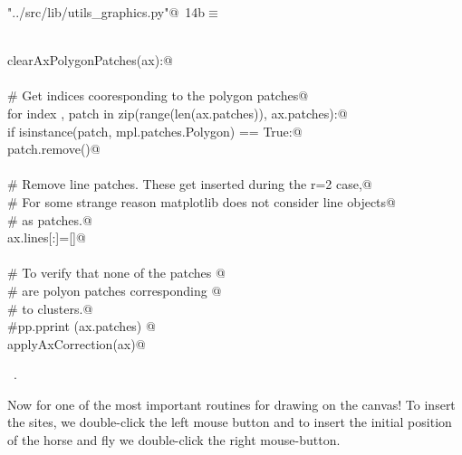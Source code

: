 \documentclass[11.5pt]{report}
\begin{document}
\begin{flushleft} \small\label{scrap4}\raggedright\small
{} \verb@"../src/lib/utils_graphics.py"@\nobreak\ {\footnotesize {14b}}$\equiv$
\vspace{-1ex}
\begin{list}{}{} \item
\mbox{}\verb@@\\
\mbox{}\verb@def clearAxPolygonPatches(ax):@\\
\mbox{}\verb@@\\
\mbox{}\verb@    # Get indices cooresponding to the polygon patches@\\
\mbox{}\verb@    for index , patch in zip(range(len(ax.patches)), ax.patches):@\\
\mbox{}\verb@        if isinstance(patch, mpl.patches.Polygon) == True:@\\
\mbox{}\verb@            patch.remove()@\\
\mbox{}\verb@@\\
\mbox{}\verb@    # Remove line patches. These get inserted during the r=2 case,@\\
\mbox{}\verb@    # For some strange reason matplotlib does not consider line objects@\\
\mbox{}\verb@    # as patches.@\\
\mbox{}\verb@    ax.lines[:]=[]@\\
\mbox{}\verb@@\\
\mbox{}\verb@    # To verify that none of the patches @\\
\mbox{}\verb@    # are polyon patches corresponding @\\
\mbox{}\verb@    # to clusters.@\\
\mbox{}\verb@    #pp.pprint (ax.patches) @\\
\mbox{}\verb@    applyAxCorrection(ax)@\\
\mbox{}\verb@@{\NWsep}
\end{list}
\vspace{-1.5ex}
\footnotesize
\begin{list}{}{\setlength{\itemsep}{-\parsep}\setlength{\itemindent}{-\leftmargin}}
\item \NWtxtFileDefBy\ .

\item{}
\end{list}
\vspace{4ex}
\end{flushleft}
\newchunk Now for one of the most important routines for drawing on the canvas! 
To insert the sites, we double-click the left mouse button and to insert the 
initial position of the horse and fly we double-click the right mouse-button. 
\end{document}
